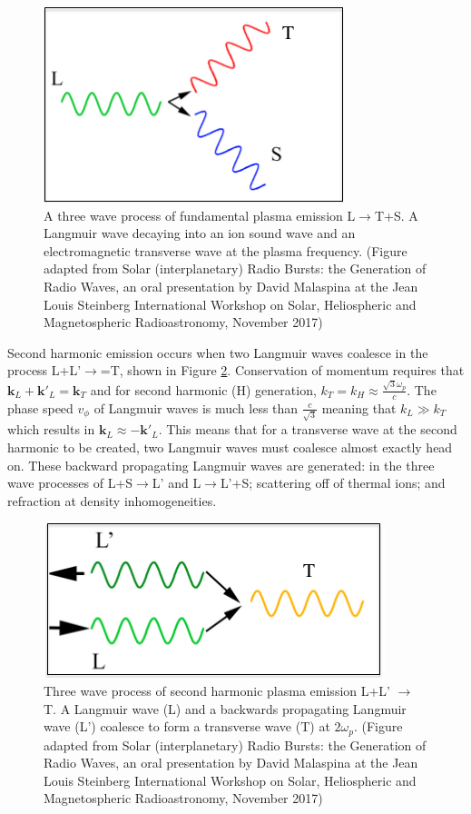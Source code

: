\begin{figure}
\centering
\includegraphics[width=0.5\columnwidth]{Images/Fundamental_emission_Lwaves.png}
\caption[A three wave process of fundamental plasma emission L$\rightarrow$T+S]{A three wave process of fundamental plasma emission L$\rightarrow$T+S. A Langmuir wave decaying into an ion sound wave and an electromagnetic transverse wave at the plasma frequency. (Figure adapted from Solar (interplanetary) Radio Bursts: the Generation of Radio Waves,	an oral presentation by David Malaspina at the Jean Louis Steinberg International Workshop on Solar, Heliospheric and Magnetospheric Radioastronomy, November 2017)}
\label{fig:Femission}
\end{figure}

Second harmonic emission occurs when two Langmuir waves coalesce in the process L+L'$\rightarrow$=T, shown in Figure \ref{fig:Hemission}. Conservation of momentum requires that $\mathbf{k}_L + \mathbf{k'}_L = \mathbf{k}_T$ and for second harmonic (H) generation, $k_T=k_H \approx \frac{\sqrt{3} \omega_p}{c}$. The phase speed $v_\phi$ of Langmuir waves is much less than $\frac{c}{\sqrt{3}}$ meaning that $k_L \gg k_T$ which results in $\mathbf{k}_L \approx -\mathbf{k'}_L$. This means that for a transverse wave at the second harmonic to be created, two Langmuir waves must coalesce almost exactly head on. These backward propagating Langmuir waves are generated: in the three wave processes of L+S$\rightarrow$L' and L$\rightarrow$L'+S; scattering off of thermal ions; and refraction at density inhomogeneities.
 \begin{figure}

     \centering
     \includegraphics[width=0.5\columnwidth]{Images/Harmonic_emission_Lwaves.png}
     \caption[Three wave process of second harmonic plasma emission L+L' $\rightarrow$ T]{Three wave process of second harmonic plasma emission L+L' $\rightarrow$ T. A Langmuir wave (L) and a backwards propagating Langmuir wave (L') coalesce to form a transverse wave (T) at $2 \omega_p$. (Figure adapted from Solar (interplanetary) Radio Bursts: the Generation of Radio Waves,	an oral presentation by David Malaspina at the Jean Louis Steinberg International Workshop on Solar, Heliospheric and Magnetospheric Radioastronomy, November 2017)}
     \label{fig:Hemission}
 \end{figure}
 

